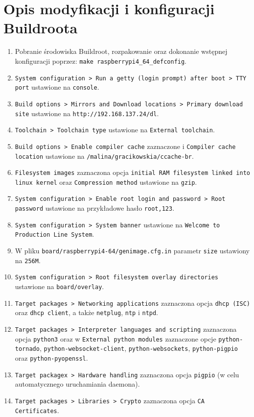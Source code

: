 \documentclass{article}
\begin{document}
\section{Opis modyfikacji i konfiguracji Buildroota}

\begin{enumerate}[label=\arabic*.]
    \item Pobranie środowiska Buildroot, rozpakowanie oraz dokonanie wstępnej konfiguracji poprzez: \texttt{make raspberrypi4\_64\_defconfig}.
    \item \texttt{System configuration > Run a getty (login prompt) after boot > TTY port} ustawione na \texttt{console}.
    \item \texttt{Build options > Mirrors and Download locations > Primary download site} ustawione na \texttt{http://192.168.137.24/dl}.
    \item \texttt{Toolchain > Toolchain type} ustawione na \texttt{External toolchain}.
    \item \texttt{Build options > Enable compiler cache} zaznaczone i \texttt{Compiler cache location} ustawione na \texttt{/malina/gracikowskia/ccache-br}.
    \item \texttt{Filesystem images} zaznaczona opcja \texttt{initial RAM filesystem linked into linux kernel} oraz \texttt{Compression method} ustawione na \texttt{gzip}.
    \item \texttt{System configuration > Enable root login and password > Root password} ustawione na przykładowe hasło \texttt{root,123}.
    \item \texttt{System configuration > System banner} ustawione na \texttt{Welcome to Production Line System}.
    \item W pliku \texttt{board/raspberrypi4-64/genimage.cfg.in} parametr \texttt{size} ustawiony na \texttt{256M}.
    \item \texttt{System configuration > Root filesystem overlay directories} ustawione na \texttt{board/overlay}.
    \item \texttt{Target packages > Networking applications} zaznaczona opcja \texttt{dhcp (ISC)} oraz \texttt{dhcp client}, a także \texttt{netplug}, \texttt{ntp} i \texttt{ntpd}.
    \item \texttt{Target packages > Interpreter languages and scripting} zaznaczona opcja \texttt{python3} oraz w \texttt{External python modules} zaznaczone opcje \texttt{python-tornado}, \texttt{python-websocket-client}, \texttt{python-websockets}, \texttt{python-pigpio} oraz \texttt{python-pyopenssl}.
    \item \texttt{Target packagex > Hardware handling} zaznaczona opcja \texttt{pigpio} (w celu automatycznego uruchamiania daemona).
    \item \texttt{Target packages > Libraries > Crypto} zaznaczona opcja \texttt{CA Certificates}.
\end{enumerate}
\end{document}
